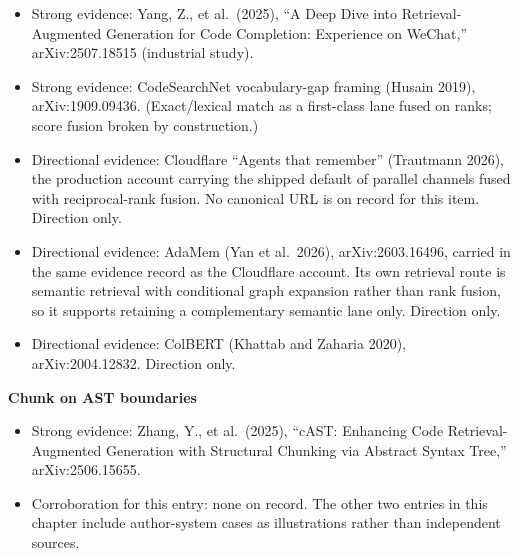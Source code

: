 \begin{itemize}
\tightlist
\item
  Strong evidence: Yang, Z., et al.~(2025), ``A Deep Dive into Retrieval-Augmented Generation for Code Completion: Experience on WeChat,'' arXiv:2507.18515 (industrial study).
\item
  Strong evidence: CodeSearchNet vocabulary-gap framing (Husain 2019), arXiv:1909.09436. (Exact/lexical match as a first-class lane fused on ranks; score fusion broken by construction.)
\item
  Directional evidence: Cloudflare ``Agents that remember'' (Trautmann 2026), the production account carrying the shipped default of parallel channels fused with reciprocal-rank fusion. No canonical URL is on record for this item. Direction only.
\item
  Directional evidence: AdaMem (Yan et al.~2026), arXiv:2603.16496, carried in the same evidence record as the Cloudflare account. Its own retrieval route is semantic retrieval with conditional graph expansion rather than rank fusion, so it supports retaining a complementary semantic lane only. Direction only.
\item
  Directional evidence: ColBERT (Khattab and Zaharia 2020), arXiv:2004.12832. Direction only.
\end{itemize}

\textbf{Chunk on AST boundaries}

\begin{itemize}
\tightlist
\item
  Strong evidence: Zhang, Y., et al.~(2025), ``cAST: Enhancing Code Retrieval-Augmented Generation with Structural Chunking via Abstract Syntax Tree,'' arXiv:2506.15655.
\item
  Corroboration for this entry: none on record. The other two entries in this chapter include author-system cases as illustrations rather than independent sources.
\end{itemize}

